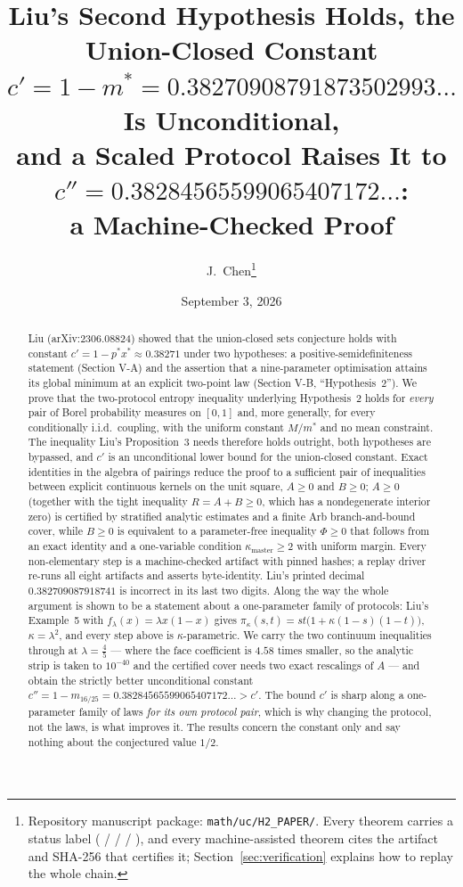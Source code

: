 \documentclass[11pt]{article}
\title{Liu's Second Hypothesis Holds, the Union-Closed Constant\\
$c'=1-m^\ast=0.38270908791873502993\ldots$ Is Unconditional,\\
and a Scaled Protocol Raises It to
$c''=0.38284565599065407172\ldots$:\\
a Machine-Checked Proof}
\author{J.\ Chen\thanks{Repository manuscript package:
\texttt{math/uc/H2\_PAPER/}.  Every theorem carries a status label
(\lbl{proved} / \lbl{machine-verified} / \lbl{computational-evidence} /
\lbl{open}), and every machine-assisted theorem cites the artifact and
SHA-256 that certifies it; Section~\ref{sec:verification} explains how to
replay the whole chain.}}
\date{September 3, 2026}
\theoremstyle{plain}
\theoremstyle{definition}
\theoremstyle{remark}
\begin{document}
\maketitle

\begin{abstract}
Liu (arXiv:2306.08824) showed that the union-closed sets conjecture holds with
constant $c'=1-p^\ast x^\ast\approx0.38271$ under two hypotheses: a
positive-semidefiniteness statement (Section V-A) and the assertion that a
nine-parameter optimisation attains its global minimum at an explicit
two-point law (Section V-B, ``Hypothesis~2'').  We prove that the two-protocol
entropy inequality underlying Hypothesis~2 holds for \emph{every} pair of
Borel probability measures on $[0,1]$ and, more generally, for every
conditionally i.i.d.\ coupling, with the uniform constant $M/m^\ast$ and no
mean constraint.  The inequality Liu's Proposition~3 needs therefore holds
outright, both hypotheses are bypassed, and $c'$ is an unconditional lower
bound for the union-closed constant.  Exact identities in the algebra of
pairings reduce the proof to a sufficient pair of inequalities between
explicit continuous kernels on the unit square, $A\ge0$ and $B\ge0$;
$A\ge0$ (together with the
tight inequality $R=A+B\ge0$, which has a nondegenerate interior zero) is
certified by stratified analytic estimates and a finite Arb branch-and-bound
cover, while $B\ge0$ is equivalent to a parameter-free inequality
$\Phi\ge0$ that follows from an exact identity and a one-variable condition
$\kappa_{\mathrm{master}}\ge2$ with uniform margin.  Every non-elementary step is a
machine-checked artifact with pinned hashes; a replay driver re-runs all
eight artifacts and asserts byte-identity.  Liu's printed
decimal $0.382709087918741$ is incorrect in its last two digits.  Along the
way the whole argument is shown to be a statement about a one-parameter
family of protocols: Liu's Example~5 with $f_\lambda(x)=\lambda x(1-x)$ gives
$\pi_\kappa(s,t)=st\bigl(1+\kappa(1-s)(1-t)\bigr)$, $\kappa=\lambda^2$, and
every step above is $\kappa$-parametric.  We carry the two continuum
inequalities through at $\lambda=\tfrac45$ --- where the face coefficient is
$4.58$ times smaller, so the analytic strip is taken to $10^{-40}$ and the
certified cover needs two exact rescalings of $A$ --- and obtain the strictly
better unconditional constant
$c''=1-m_{16/25}=0.38284565599065407172\ldots>c'$.  The bound $c'$ is sharp
along a one-parameter family of laws \emph{for its own protocol pair}, which
is why changing the protocol, not the laws, is what improves it.  The results
concern the constant only and say nothing about the conjectured value $1/2$.
\end{abstract}
\end{document}
